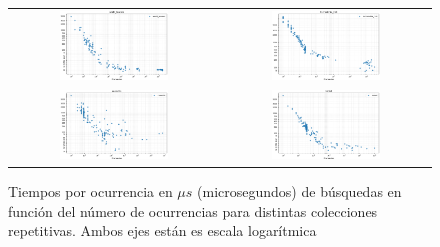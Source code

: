 \begin{figure}
    \centering
    \captionsetup{position=above}
    \caption{Tiempos por ocurrencia en $\mu s$ (microsegundos) de búsquedas en función del número de ocurrencias para distintas colecciones repetitivas. Ambos ejes están es escala logarítmica}
    \hspace*{-\marginparwidth}
    \begin{tabular}{cc} %
        \includegraphics[width=0.55\textwidth]{imagenes/SEARCH_world_leaders.png} & \includegraphics[width=0.55\textwidth]{imagenes/SEARCH_Escherichia.png} \\
        \includegraphics[width=0.55\textwidth]{imagenes/SEARCH_coreutils.png} & \includegraphics[width=0.55\textwidth]{imagenes/SEARCH_kernel.png} \\

\end{tabular}
\end{figure}
